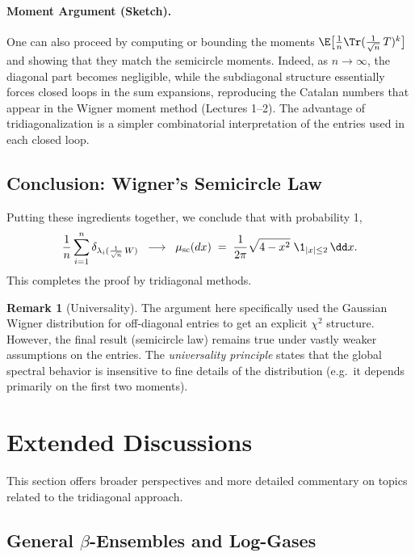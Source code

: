 \documentclass[letterpaper,11pt,oneside,reqno]{article}
\numberwithin{equation}{section}
\theoremstyle{definition}
\newtheorem{remark}[proposition]{Remark}
\begin{document}
\paragraph{Moment Argument (Sketch).}
One can also proceed by computing or bounding the moments $\E\bigl[\frac{1}{n}\Tr(\frac{1}{\sqrt{n}}\,T)^k\bigr]$ and showing that they match the semicircle moments. Indeed, as $n\to\infty$, the diagonal part becomes negligible, while the subdiagonal structure essentially forces closed loops in the sum expansions, reproducing the Catalan numbers that appear in the Wigner moment method (Lectures 1--2). The advantage of tridiagonalization is a simpler combinatorial interpretation of the entries used in each closed loop.

\subsection{Conclusion: Wigner’s Semicircle Law}

Putting these ingredients together, we conclude that with probability 1,
\[
  \frac{1}{n}\sum_{i=1}^n \delta_{\lambda_i(\frac1{\sqrt{n}}\,W)}
  \;\;\longrightarrow\;\;
  \mu_{\mathrm{sc}}(dx) \;=\; \frac{1}{2\pi}\sqrt{4-x^2}\;\1_{|x|\le2}\,\dd x.
\]
This completes the proof by tridiagonal methods.

\begin{remark}[Universality]
The argument here specifically used the Gaussian Wigner distribution for off-diagonal entries to get an explicit $\chi^2$ structure. However, the final result (semicircle law) remains true under vastly weaker assumptions on the entries. The \emph{universality principle} states that the global spectral behavior is insensitive to fine details of the distribution (e.g.\ it depends primarily on the first two moments).
\end{remark}

\section{Extended Discussions}
\label{sec:extended-discussion}

This section offers broader perspectives and more detailed commentary on topics related to the tridiagonal approach.

\subsection{General \texorpdfstring{$\beta$}{beta}-Ensembles and Log-Gases}
\end{document}
